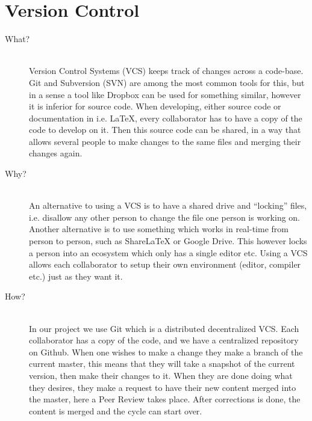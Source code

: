 \section*{Version Control}
\label{sec:versioncontrol}
\begin{description}
    \item[What?]\hfill\\
    Version Control Systems (VCS) keeps track of changes across a code-base. 
    Git and Subversion (SVN) are among the most common tools for this, but in a sense a tool like Dropbox can be used for something similar, however it is inferior for source code.
    When developing, either source code or documentation in i.e. LaTeX, every collaborator has to have a copy of the code to develop on it. 
    Then this source code can be shared, in a way that allows several people to make changes to the same files and merging their changes again. 
    \item[Why?]\hfill\\ 
    An alternative to using a VCS is to have a shared drive and ``locking'' files, i.e. disallow any other person to change the file one person is working on. 
    Another alternative is to use something which works in real-time from person to person, such as ShareLaTeX or Google Drive. 
    This however locks a person into an ecosystem which only has a single editor etc. 
    Using a VCS allows each collaborator to setup their own environment (editor, compiler etc.) just as they want it. 
    \item[How?]\hfill\\
    In our project we use Git which is a distributed decentralized VCS. 
    Each collaborator has a copy of the code, and we have a centralized repository on Github. 
    When one wishes to make a change they make a branch of the current master, this means that they will take a snapshot of the current version, then make their changes to it.
    When they are done doing what they desires, they make a request to have their new content merged into the master, here a Peer Review takes place. 
    After corrections is done, the content is merged and the cycle can start over. 
\end{description}

